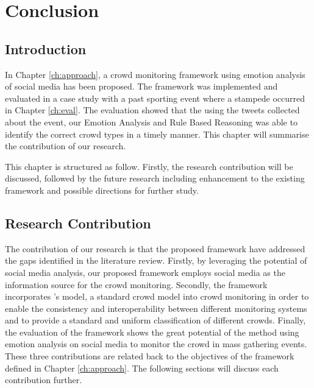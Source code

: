 \chapter{Conclusion}

\ifpdf
    \graphicspath{{Chapter6/Figs/Raster/}{Chapter6/Figs/PDF/}{Chapter6/Figs/}}
\else
    \graphicspath{{Chapter6/Figs/Vector/}{Chapter6/Figs/}}
\fi

\section{Introduction}

In Chapter \ref{ch:approach}, a crowd monitoring framework using emotion analysis of social media has been proposed. The framework was implemented and evaluated in a case study with a past sporting event where a stampede occurred in Chapter \ref{ch:eval}. The evaluation showed that the using the tweets collected about the event, our Emotion Analysis and Rule Based Reasoning was able to identify the correct crowd types in a timely manner. This chapter will summarise the contribution of our research.

This chapter is structured as follow. Firstly, the research contribution will be discussed, followed by the future research including enhancement to the existing framework and possible directions for further study.

\section{Research Contribution}
The contribution of our research is that the proposed framework have addressed the gaps identified in the literature review. Firstly, by leveraging the potential of social media analysis, our proposed framework employs social media as the information source for the crowd monitoring. Secondly, the framework incorporates \citet{Berlonghi1995}'s model, a standard crowd model into crowd monitoring in order to enable the consistency and interoperability between different monitoring systems and to provide a standard and uniform classification of different crowds. Finally, the evaluation of the framework shows the great potential of the method using emotion analysis on social media to monitor the crowd in mass gathering events. These three contributions are related back to the objectives of the framework defined in Chapter \ref{ch:approach}. The following sections will discuss each contribution further.

